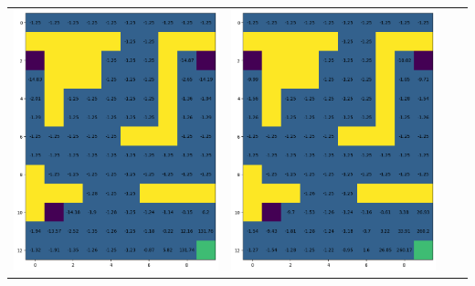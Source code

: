 \documentclass[12pt,a4paper]{report}
\begin{document}
\begin{landscape}
\begin{center}
\begin{tabular}{c || c  c  c}
            \includegraphics[width=0.35\textheight]{assets/dp/analysis/prob_0.25_gamma_0.2_value.png}
        & 
            \includegraphics[width=0.35\textheight]{assets/dp/analysis/prob_0.5_gamma_0.2_value.png}

\end{tabular}
\end{center}
\end{landscape}
\end{document}
